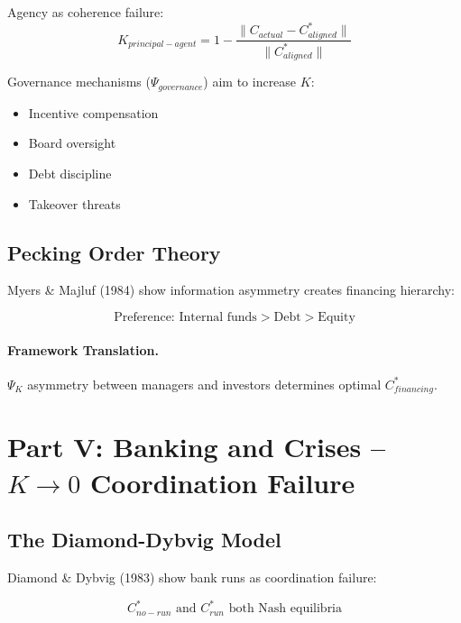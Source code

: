 Agency as coherence failure:
\begin{equation}
K_{principal-agent} = 1 - \frac{\|C_{actual} - C^*_{aligned}\|}{\|C^*_{aligned}\|}
\end{equation}

Governance mechanisms ($\Psi_{governance}$) aim to increase $K$:
\begin{itemize}
    \item Incentive compensation
    \item Board oversight
    \item Debt discipline
    \item Takeover threats
\end{itemize}

\subsection{Pecking Order Theory}

Myers \& Majluf (1984) show information asymmetry creates financing hierarchy:

\begin{equation}
\text{Preference: Internal funds} > \text{Debt} > \text{Equity}
\end{equation}

\paragraph{Framework Translation.}
$\Psi_K$ asymmetry between managers and investors determines optimal $C^*_{financing}$.


\section{Part V: Banking and Crises -- $K \to 0$ Coordination Failure}
\label{sec:Y-banking}

\subsection{The Diamond-Dybvig Model}

Diamond \& Dybvig (1983) show bank runs as coordination failure:

\begin{equation}
\boxed{
C^*_{no-run} \text{ and } C^*_{run} \text{ both Nash equilibria}
}
\label{eq:dd}
\end{equation}

